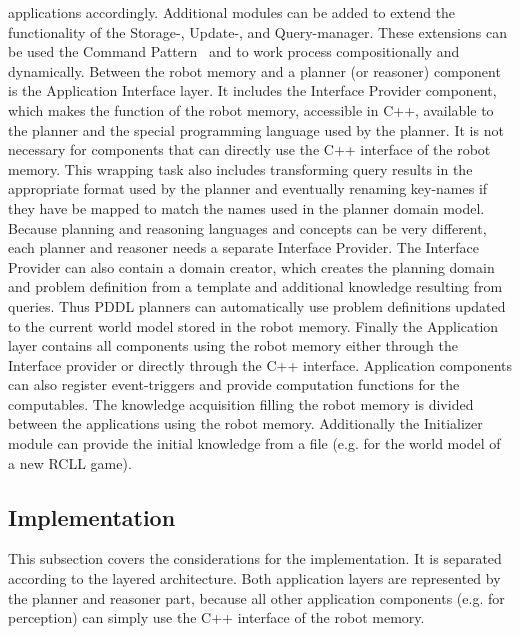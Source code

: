 \documentclass[a4paper,11pt]{article}
\begin{document}
applications accordingly. Additional modules can be added to extend
the functionality of the Storage-, Update-, and Query-manager. These
extensions can be used the Command Pattern~\cite{design-patterns}
and to work process compositionally and dynamically.
Between the robot memory and a
planner (or reasoner) component is the Application Interface layer. It
includes the Interface Provider component, which makes the function of
the robot memory, accessible in C++, available to the
planner and the special programming language used by the planner. It
is not necessary for components that can directly use the C++
interface of the robot memory. This wrapping task also includes
transforming query results in the appropriate format used by the planner
and eventually renaming key-names if they have be mapped to match
the names used in the planner domain model. Because planning and
reasoning languages and concepts can be very different, each planner
and reasoner needs a separate Interface Provider. The Interface
Provider can also contain a domain creator, which creates the planning
domain and problem definition from a template and additional knowledge
resulting from queries. Thus PDDL planners
can automatically use problem definitions updated to the
current world model stored in the robot memory. Finally the Application
layer contains all components using the robot memory either through
the Interface provider or directly through the C++
interface. Application components can also register event-triggers and
provide computation functions for the computables. The
knowledge acquisition filling the robot memory is divided between the
applications using the robot memory. Additionally the Initializer
module can provide the initial knowledge from a file (e.g. for the
world model of a new RCLL game).


\subsection{Implementation}
\label{sec:impl}
This subsection covers the considerations for the implementation. It is
separated according to the layered architecture. Both application
layers are represented by the planner and reasoner part, because all
other application components (e.g. for perception) can simply use the
C++ interface of the robot memory.
\end{document}
